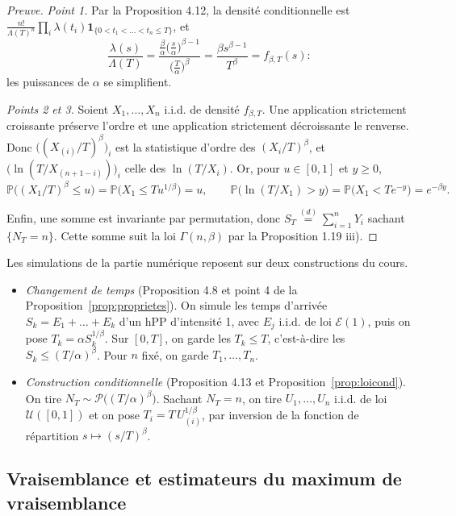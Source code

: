 \begin{proof}[Preuve]
\emph{Point 1.} Par la Proposition 4.12, la densité conditionnelle est $\frac{n!}{\Lambda(T)^n}\prod_i\lambda(t_i)\mathbf{1}_{\{0<t_1<\dots<t_n\le T\}}$, et
\[
\frac{\lambda(s)}{\Lambda(T)}=\frac{\frac{\beta}{\alpha}\big(\frac{s}{\alpha}\big)^{\beta-1}}{\big(\frac{T}{\alpha}\big)^{\beta}}=\frac{\beta s^{\beta-1}}{T^\beta}=f_{\beta,T}(s) :
\]
les puissances de $\alpha$ se simplifient.

\emph{Points 2 et 3.} Soient $X_1,\dots,X_n$ i.i.d. de densité $f_{\beta,T}$. Une application strictement croissante préserve l'ordre et une application strictement décroissante le renverse. Donc $\big((X_{(i)}/T)^\beta\big)_i$ est la statistique d'ordre des $(X_i/T)^\beta$, et $\big(\ln(T/X_{(n+1-i)})\big)_i$ celle des $\ln(T/X_i)$. Or, pour $u\in[0,1]$ et $y\ge0$,
\[
\mathbb{P}\big((X_1/T)^\beta\le u\big)=\mathbb{P}\big(X_1\le Tu^{1/\beta}\big)=u,
\qquad
\mathbb{P}\big(\ln(T/X_1)>y\big)=\mathbb{P}\big(X_1<Te^{-y}\big)=e^{-\beta y}.
\]

Enfin, une somme est invariante par permutation, donc $S_T\overset{(d)}{=}\sum_{i=1}^n Y_i$ sachant $\{N_T=n\}$. Cette somme suit la loi $\Gamma(n,\beta)$ par la Proposition 1.19 iii).
\end{proof}

\begin{remarque}[Simulation]\label{rem:simulation}
Les simulations de la partie numérique reposent sur deux constructions du cours.
\begin{itemize}
\item \emph{Changement de temps} (Proposition 4.8 et point 4 de la Proposition~\ref{prop:proprietes}). On simule les temps d'arrivée $S_k=E_1+\dots+E_k$ d'un hPP d'intensité 1, avec $E_j$ i.i.d. de loi $\mathcal{E}(1)$, puis on pose $T_k=\alpha S_k^{1/\beta}$. Sur $[0,T]$, on garde les $T_k\le T$, c'est-à-dire les $S_k\le(T/\alpha)^\beta$. Pour $n$ fixé, on garde $T_1,\dots,T_n$.
\item \emph{Construction conditionnelle} (Proposition 4.13 et Proposition~\ref{prop:loicond}). On tire $N_T\sim\mathcal{P}\big((T/\alpha)^\beta\big)$. Sachant $N_T=n$, on tire $U_1,\dots,U_n$ i.i.d. de loi $\mathcal{U}([0,1])$ et on pose $T_i=T\,U_{(i)}^{1/\beta}$, par inversion de la fonction de répartition $s\mapsto(s/T)^\beta$.
\end{itemize}
\end{remarque}

\subsection{Vraisemblance et estimateurs du maximum de vraisemblance}\label{sec:emv}


